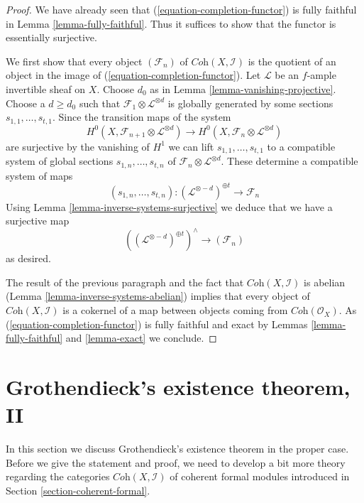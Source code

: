 \documentclass[10pt,a4paper]{amsart}
\theoremstyle{plain}
\theoremstyle{definition}
\theoremstyle{remark}
\numberwithin{equation}{subsection}
\begin{document}
\begin{proof}
We have already seen that (\ref{equation-completion-functor}) is
fully faithful in Lemma \ref{lemma-fully-faithful}. Thus it suffices
to show that the functor is essentially surjective.

\medskip\noindent
We first show that every object $(\mathcal{F}_n)$ of
$\textit{Coh}(X, \mathcal{I})$ is the quotient of an object
in the image of (\ref{equation-completion-functor}). 
Let $\mathcal{L}$ be an $f$-ample invertible sheaf on $X$.
Choose $d_0$ as in Lemma \ref{lemma-vanishing-projective}.
Choose a $d \geq d_0$ such that
$\mathcal{F}_1 \otimes \mathcal{L}^{\otimes d}$
is globally generated by some sections $s_{1, 1}, \ldots, s_{t, 1}$.
Since the transition maps of the system
$$
H^0(X, \mathcal{F}_{n + 1} \otimes \mathcal{L}^{\otimes d})
\longrightarrow
H^0(X, \mathcal{F}_n \otimes \mathcal{L}^{\otimes d})
$$
are surjective by the vanishing of $H^1$ we can lift
$s_{1, 1}, \ldots, s_{t, 1}$ to a compatible system of global sections
$s_{1, n}, \ldots, s_{t, n}$ of
$\mathcal{F}_n \otimes \mathcal{L}^{\otimes d}$.
These determine a compatible system of maps
$$
(s_{1, n}, \ldots, s_{t, n}) :
(\mathcal{L}^{\otimes -d})^{\oplus t} \longrightarrow \mathcal{F}_n
$$
Using Lemma \ref{lemma-inverse-systems-surjective}
we deduce that we have a surjective map
$$
\left((\mathcal{L}^{\otimes -d})^{\oplus t}\right)^\wedge
\longrightarrow
(\mathcal{F}_n)
$$
as desired.

\medskip\noindent
The result of the previous paragraph and the fact that
$\textit{Coh}(X, \mathcal{I})$ is abelian
(Lemma \ref{lemma-inverse-systems-abelian})
implies that
every object of $\textit{Coh}(X, \mathcal{I})$ is a cokernel
of a map between objects coming from $\textit{Coh}(\mathcal{O}_X)$.
As (\ref{equation-completion-functor}) is fully faithful and exact by
Lemmas \ref{lemma-fully-faithful} and \ref{lemma-exact}
we conclude.
\end{proof}








\section{Grothendieck's existence theorem, II}
\label{section-existence-proper}

\noindent
In this section we discuss Grothendieck's existence theorem in the proper case.
Before we give the statement and proof, we need to develop a bit
more theory regarding the categories $\textit{Coh}(X, \mathcal{I})$
of coherent formal modules
introduced in Section \ref{section-coherent-formal}.
\end{document}
